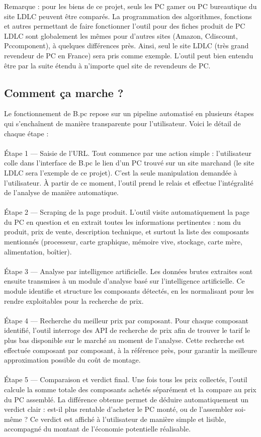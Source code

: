 \documentclass[a4paper, 12pt, twoside]{article}
\begin{document}
Remarque : pour les biens de ce projet, seuls les PC gamer ou PC bureautique du site LDLC peuvent être comparés. La programmation des algorithmes, fonctions et autres permettant de faire fonctionner l’outil pour des fiches produit de PC LDLC sont globalement les mêmes pour d'autres sites (Amazon, Cdiscount, Pccomponent), à quelques différences près. Ainsi, seul le site LDLC (très grand revendeur de PC en France) sera pris comme exemple. L'outil peut bien entendu être par la suite étendu à n’importe quel site de revendeurs de PC.




	\subsection{Comment ça marche ?
}

Le fonctionnement de B.pc repose sur un pipeline automatisé en plusieurs étapes qui s'enchaînent de manière transparente pour l'utilisateur. Voici le détail de chaque étape :\\
\\
Étape 1 — Saisie de l'URL. Tout commence par une action simple : l'utilisateur colle dans l'interface de B.pc le lien d'un PC trouvé sur un site marchand (le site LDLC sera l’exemple de ce projet). C'est la seule manipulation demandée à l'utilisateur. À partir de ce moment, l'outil prend le relais et effectue l'intégralité de l'analyse de manière automatique.\\
\\
Étape 2 — Scraping de la page produit. L'outil visite automatiquement la page du PC en question et en extrait toutes les informations pertinentes : nom du produit, prix de vente, description technique, et surtout la liste des composants mentionnés (processeur, carte graphique, mémoire vive, stockage, carte mère, alimentation, boîtier).\\
\\
Étape 3 — Analyse par intelligence artificielle. Les données brutes extraites sont ensuite transmises à un module d'analyse basé sur l'intelligence artificielle. Ce module identifie et structure les composants détectés, en les normalisant pour les rendre exploitables pour la recherche de prix.\\
\\
Étape 4 — Recherche du meilleur prix par composant. Pour chaque composant identifié, l'outil interroge des API de recherche de prix afin de trouver le tarif le plus bas disponible sur le marché au moment de l'analyse. Cette recherche est effectuée composant par composant, à la référence près, pour garantir la meilleure approximation possible du coût de montage.\\
\\
Étape 5 — Comparaison et verdict final. Une fois tous les prix collectés, l'outil calcule la somme totale des composants achetés séparément et la compare au prix du PC assemblé. La différence obtenue permet de déduire automatiquement un verdict clair : est-il plus rentable d'acheter le PC monté, ou de l'assembler soi-même ? Ce verdict est affiché à l'utilisateur de manière simple et lisible, accompagné du montant de l'économie potentielle réalisable.\\
\end{document}
